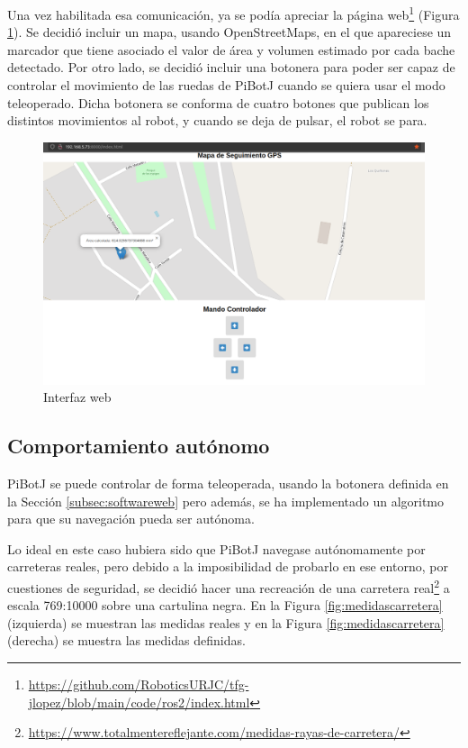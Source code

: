 Una vez habilitada esa comunicación, ya se podía apreciar la página web\footnote{\url{https://github.com/RoboticsURJC/tfg-jlopez/blob/main/code/ros2/index.html}} (Figura \ref{fig:interfazweb}). Se decidió incluir un mapa, usando OpenStreetMaps, en el que apareciese un marcador que tiene asociado el valor de área y volumen estimado por cada bache detectado. Por otro lado, se decidió incluir una botonera para poder ser capaz de controlar el movimiento de las ruedas de PiBotJ cuando se quiera usar el modo teleoperado. Dicha botonera se conforma de cuatro botones que publican los distintos movimientos al robot, y cuando se deja de pulsar, el robot se para.


\begin{figure} [h!]
	\begin{center}
		\includegraphics[width=12cm]{figs/cap6/interfazweb.png}
	\end{center}
	\caption{Interfaz web}
	\label{fig:interfazweb}
\end{figure}


\subsection{Comportamiento autónomo}
\label{subsec:autonomo}
PiBotJ se puede controlar de forma teleoperada, usando la botonera definida en la Sección \ref{subsec:softwareweb} pero además, se ha implementado un algoritmo para que su navegación pueda ser autónoma.

Lo ideal en este caso hubiera sido que PiBotJ navegase autónomamente por carreteras reales, pero debido a la imposibilidad de probarlo en ese entorno, por cuestiones de seguridad, se decidió hacer una recreación de una carretera real\footnote{\url{https://www.totalmentereflejante.com/medidas-rayas-de-carretera/}} a escala 769:10000 sobre una cartulina negra. En la Figura \ref{fig:medidascarretera} (izquierda) se muestran las medidas reales y en la Figura \ref{fig:medidascarretera} (derecha) se muestra las medidas definidas. 

